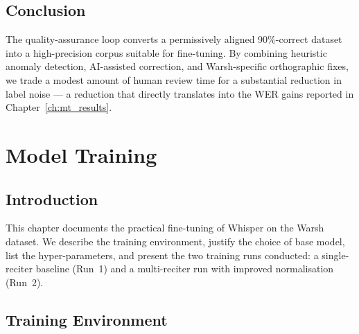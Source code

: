 \documentclass[12pt,a4paper]{report}
\begin{document}
\section{Conclusion}

The quality-assurance loop converts a permissively aligned 90\%-correct
dataset into a high-precision corpus suitable for fine-tuning. By
combining heuristic anomaly detection, AI-assisted correction, and
Warsh-specific orthographic fixes, we trade a modest amount of human
review time for a substantial reduction in label noise --- a reduction
that directly translates into the WER gains reported in
Chapter~\ref{ch:mt_results}.

\chapter{Model Training}
\label{ch:mt_training}

\section{Introduction}
This chapter documents the practical fine-tuning of Whisper on the
Warsh dataset. We describe the training environment, justify the choice
of base model, list the hyper-parameters, and present the two training
runs conducted: a single-reciter baseline (Run~1) and a multi-reciter
run with improved normalisation (Run~2).

\section{Training Environment}
\end{document}
